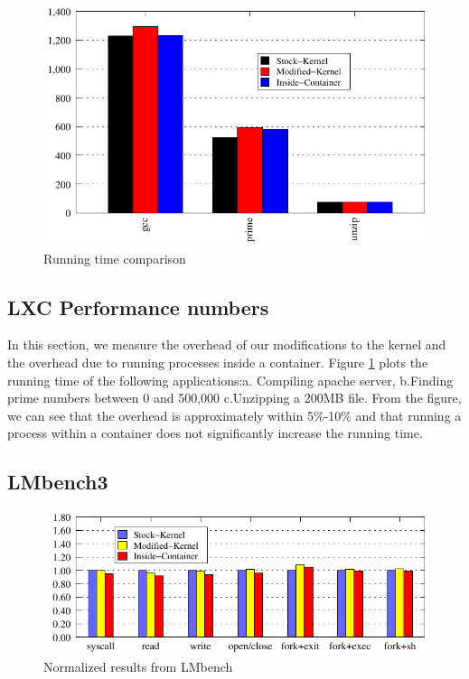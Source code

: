\begin{figure}[tbh]
\centering
\includegraphics[width=1.0\columnwidth]{perf}
\caption{Running time comparison}
\label{fig:perf}
\end{figure}

\subsection{LXC Performance numbers}
In this section, we measure the overhead of our modifications to the kernel and the overhead due to running processes inside a container. Figure \ref{fig:perf} plots the running time of the following applications:a. Compiling apache server, b.Finding prime numbers between 0 and 500,000 c.Unzipping a 200MB file.
From the figure, we can see that the overhead is approximately within 5\%-10\% and that running a process within a container does not significantly increase the running time.


\subsection{LMbench3} 
\label{sec:LMbench3}

\begin{figure}[bth]
\centering
\includegraphics[width=2.0\columnwidth]{lmbench}
\caption{Normalized results from LMbench}
\label{fig:lmbench}
\end{figure}

